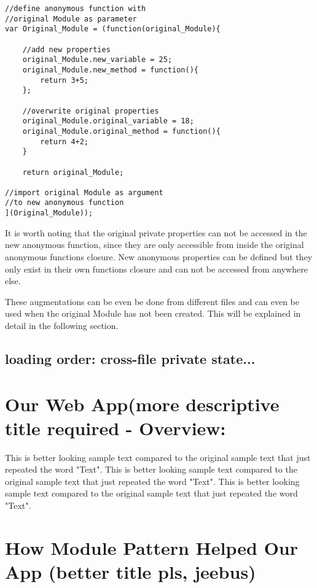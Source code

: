 \documentclass{bioinfo}
\begin{document}
\begin{lstlisting}
//define anonymous function with
//original Module as parameter
var Original_Module = (function(original_Module){
	
	//add new properties	
	original_Module.new_variable = 25;
	original_Module.new_method = function(){
		return 3+5;
	};
	
	//overwrite original properties
	original_Module.original_variable = 18;
	original_Module.original_method = function(){
		return 4+2;
	}
	
	return original_Module;
	
//import original Module as argument
//to new anonymous function
](Original_Module));
\end{lstlisting}



It is worth noting that the original private properties can not be accessed in the new anonymous function, since they are only accessible from inside the original anonymous functions closure. New anonymous properties can be defined but they only exist in their own functions closure and can not be accessed from anywhere else.\vspace{\baselineskip}

These augmentations can be even be done from different files and can even be used when the original Module has not been created. This will be explained in detail in the following section.







\subsection{loading order: cross-file private state...}

\section{Our Web App(more descriptive title required - Overview:}

This is better looking sample text compared to the original sample text that just repeated the word "Text". This is better looking sample text compared to the original sample text that just repeated the word "Text". This is better looking sample text compared to the original sample text that just repeated the word "Text".


\section{How Module Pattern Helped Our App (better title pls, jeebus)}
\end{document}

